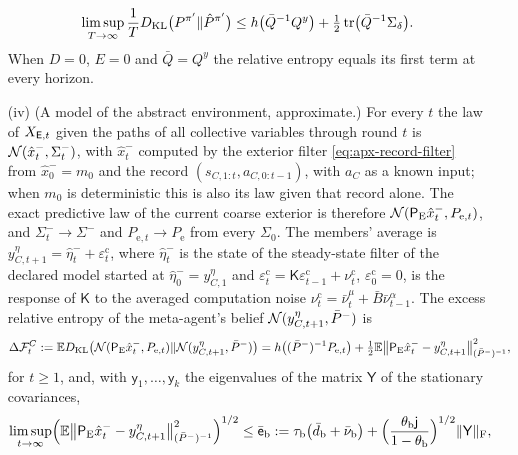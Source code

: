 \begin{theorem}
\begin{enumerate}
\begin{equation}\label{eq:apx-h5a-path}
\limsup_{T\to\infty}\frac1T\KL\bigl(P^{\pi'}\Vert\hat P^{\pi'}\bigr)\le h\bigl(\bar Q^{-1}Q^y\bigr)+\tfrac12\tr\bigl(\bar Q^{-1}\Sigma_\delta\bigr) .
\end{equation}
When $D=0$, $E=0$ and $\bar Q=Q^y$ the relative entropy equals its first term at every horizon.
\item[(iv)] (A model of the abstract environment, approximate.) For every $t$ the law of $X_{\mathsf{E},t}$ given the paths of all collective variables through round $t$ is $\mathcal{N}(\hat x^-_t,\Sigma^-_t)$, with $\hat x^-_t$ computed by the exterior filter \eqref{eq:apx-record-filter} from $\hat x^-_0=m_0$ and the record $(s_{C,1:t},a_{C,0:t-1})$, with $a_C$ as a known input; when $m_0$ is deterministic this is also its law given that record alone. The exact predictive law of the current coarse exterior is therefore $\mathcal{N}(\mathsf P_{\mathrm E}\hat x^-_t,P_{\mathrm e,t})$, and $\Sigma^-_t\to\Sigma^-$ and $P_{\mathrm e,t}\to P_{\mathrm e}$ from every $\Sigma_0$. The members' average is $y^\eta_{C,t+1}=\hat\eta^-_t+\varepsilon^{\mathrm c}_t$, where $\hat\eta^-_t$ is the state of the steady-state filter of the declared model started at $\hat\eta^-_0=y^\eta_{C,1}$ and $\varepsilon^{\mathrm c}_t=\mathsf K\varepsilon^{\mathrm c}_{t-1}+\nu^{\mathrm c}_t$, $\varepsilon^{\mathrm c}_0=0$, is the response of $\mathsf K$ to the averaged computation noise $\nu^{\mathrm c}_t=\bar\nu^\mu_t+\bar B\bar\nu^\alpha_{t-1}$. The excess relative entropy of the meta-agent's belief $\mathcal{N}(y^\eta_{C,t+1},\bar P^-)$ is
\begin{equation}\label{eq:apx-h5a-split}
\Delta\mathcal F^C_t:=\mathbb{E}D_{\mathrm{KL}}\bigl(\mathcal{N}(\mathsf P_{\mathrm E}\hat x^-_t,P_{\mathrm e,t})\Vert\mathcal{N}(y^\eta_{C,t+1},\bar P^-)\bigr)=h\bigl((\bar P^-)^{-1}P_{\mathrm e,t}\bigr)+\tfrac12\mathbb{E}\bigl\Vert\mathsf P_{\mathrm E}\hat x^-_t-y^\eta_{C,t+1}\bigr\Vert^2_{(\bar P^-)^{-1}},
\end{equation}
for $t\ge1$, and, with $\mathsf y_1,\dots,\mathsf y_k$ the eigenvalues of the matrix $\mathsf Y$ of the stationary covariances,
\begin{equation}\label{eq:apx-h5a}
\begin{gathered}
\limsup_{t\to\infty}\Bigl(\E\bigl\Vert\mathsf P_{\mathrm E}\hat x^-_t-y^\eta_{C,t+1}\bigr\Vert^2_{(\bar P^-)^{-1}}\Bigr)^{1/2}\le\bar{\mathsf e}_{\mathrm b}:=\tau_{\mathrm b}\bigl(\bar d_{\mathrm b}+\bar\nu_{\mathrm b}\bigr)+\Bigl(\frac{\theta_{\mathrm b}\mathsf j}{1-\theta_{\mathrm b}}\Bigr)^{1/2}\Vert\mathsf Y\Vert_{\mathrm F},\\

\end{gathered}
\end{equation}
\end{enumerate}
\end{theorem}
